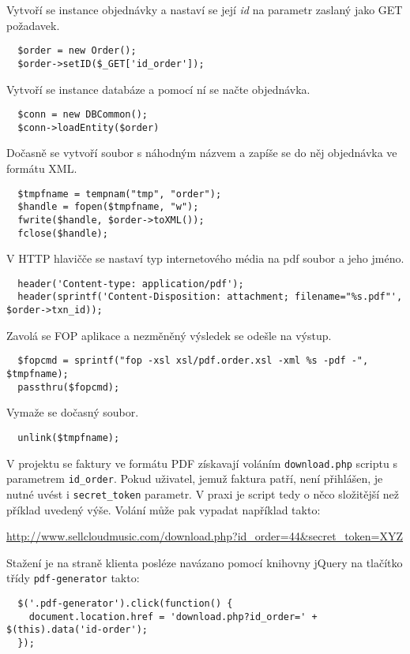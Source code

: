 \documentclass[12pt]{article}
\begin{document}
\lstset{language=PHP}
Vytvoří se instance objednávky a nastaví se její \emph{id} na parametr zaslaný jako GET požadavek.
\begin{lstlisting}
  $order = new Order();
  $order->setID($_GET['id_order']);
\end{lstlisting}

Vytvoří se instance databáze a pomocí ní se načte objednávka.
\begin{lstlisting}
  $conn = new DBCommon();
  $conn->loadEntity($order)
\end{lstlisting}

Dočasně se vytvoří soubor s náhodným názvem a zapíše se do něj objednávka ve formátu XML.
\begin{lstlisting}
  $tmpfname = tempnam("tmp", "order");
  $handle = fopen($tmpfname, "w");
  fwrite($handle, $order->toXML());
  fclose($handle);
\end{lstlisting}
V HTTP hlavičče se nastaví typ internetového média na pdf soubor a jeho jméno.
\begin{lstlisting}
  header('Content-type: application/pdf');
  header(sprintf('Content-Disposition: attachment; filename="%s.pdf"', $order->txn_id));
\end{lstlisting}
Zavolá se FOP aplikace a nezměněný výsledek se odešle na výstup.
\begin{lstlisting}
  $fopcmd = sprintf("fop -xsl xsl/pdf.order.xsl -xml %s -pdf -", $tmpfname);
  passthru($fopcmd);
\end{lstlisting}

Vymaže se dočasný soubor.
\begin{lstlisting}
  unlink($tmpfname);
\end{lstlisting}
V projektu se faktury ve formátu PDF získavají voláním \texttt{download.php} scriptu s parametrem \texttt{id\_order}. Pokud uživatel, jemuž faktura patří, není přihlášen, je nutné uvést i \texttt{secret\_token} parametr. V praxi je script tedy o něco složitější než příklad uvedený výše. Volání může pak vypadat například takto:\newline

\url{http://www.sellcloudmusic.com/download.php?id\_order=44\&secret\_token=XYZ}\newline

Stažení je na straně klienta posléze navázano pomocí knihovny jQuery na tlačítko třídy \texttt{pdf-generator} takto:

\lstset{language=Java}
\begin{lstlisting}
  $('.pdf-generator').click(function() {
    document.location.href = 'download.php?id_order=' + $(this).data('id-order');
  });
\end{lstlisting}
\end{document}

